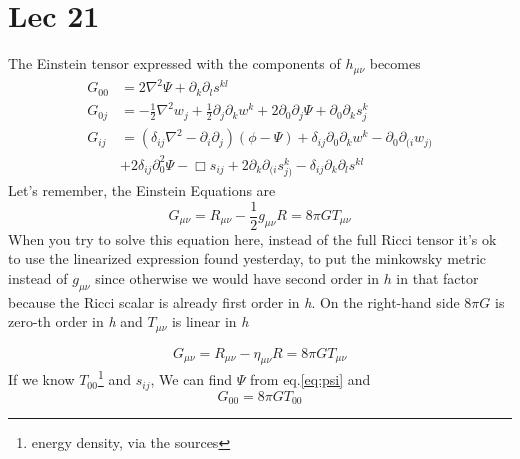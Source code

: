 \section{Lec 21}
The Einstein tensor expressed with the components of $h_{\mu \nu }$ becomes
\begin{align}
	G_{00} &= 2 \nabla ^{2}\Psi + \partial_{k}\partial_{l}s^{kl} \label{eq:psi}\\
	G_{0j} &= -\frac{1}{2} \nabla ^{2}w_{j}+\frac{1}{2}\partial_{j}\partial_{k}w^{k} + 2 \partial_{0}\partial_{j}\Psi + \partial_{0}\partial_{k}s^{k}_{j} \\
	G_{ij} &= \left( \delta _{ij} \nabla ^{2} - \partial_{i}\partial_{j} \right)\left( \phi -\Psi  \right) + \delta _{ij}\partial_{0}\partial_{k}w^{k} - \partial_{0}\partial_{( i}w_{j)} \\
	       & +2\delta _{ij}\partial_{0}^{2}\Psi - \Box s_{ij} + 2\partial_{k}\partial_{( i}s_{j)}^{k}-\delta _{ij}\partial_{k}\partial_{l}s^{kl} 
\end{align}
Let's remember, the Einstein Equations are
\[
G_{\mu \nu } = R_{\mu \nu } -\frac{1}{2}g_{\mu \nu }R = 8\pi G T_{\mu \nu }
\]
When you try to solve this equation here, instead of the full Ricci tensor it's ok to use the linearized expression found yesterday, to put the minkowsky metric instead of $g_{\mu \nu }$ since otherwise we would have second order in $h$ in that factor because the Ricci scalar is already first order in \emph{h}. On the right-hand side $8\pi G$ is zero-th order in \emph{h} and $T_{\mu \nu } $ is linear in \emph{h}\par
\[
G_{\mu \nu } = R_{\mu \nu } -\eta _{\mu \nu }R = 8\pi G T_{\mu \nu }
\]
If we know $T_{00 }$\footnote{energy density, via the sources} and $s_{ij}$, We can find $\Psi $ from eq.\ref{eq:psi} and
\[
G_{00} = 8\pi G T_{00}
\]














